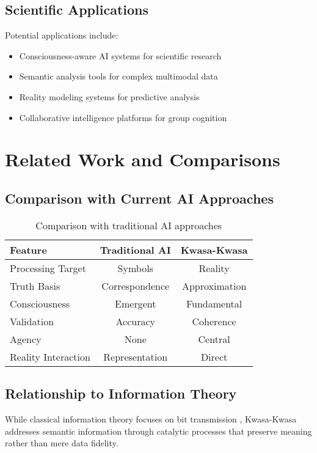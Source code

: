 \documentclass[11pt,twocolumn]{article}
\theoremstyle{remark}
\begin{document}
\subsection{Scientific Applications}

Potential applications include:
\begin{itemize}
\item Consciousness-aware AI systems for scientific research
\item Semantic analysis tools for complex multimodal data
\item Reality modeling systems for predictive analysis
\item Collaborative intelligence platforms for group cognition
\end{itemize}

\section{Related Work and Comparisons}

\subsection{Comparison with Current AI Approaches}

\begin{table}[h]
\centering
\small
\begin{tabular}{lcc}
\toprule
\textbf{Feature} & \textbf{Traditional AI} & \textbf{Kwasa-Kwasa} \\
\midrule
Processing Target & Symbols & Reality \\
Truth Basis & Correspondence & Approximation \\
Consciousness & Emergent & Fundamental \\
Validation & Accuracy & Coherence \\
Agency & None & Central \\
Reality Interaction & Representation & Direct \\
\bottomrule
\end{tabular}
\caption{Comparison with traditional AI approaches}
\end{table}

\subsection{Relationship to Information Theory}

While classical information theory focuses on bit transmission \cite{shannon1948mathematical}, Kwasa-Kwasa addresses semantic information through catalytic processes that preserve meaning rather than mere data fidelity.
\end{document}
